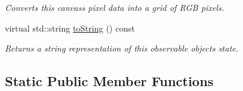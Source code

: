 \begin{DoxyCompactItemize}
\begin{DoxyCompactList}\small\item\em Converts this canvas\textquotesingle{}s pixel data into a grid of R\+GB pixels. \end{DoxyCompactList}\item 
virtual std\+::string \mbox{\hyperlink{classGObservable_a1fe5121d6528fdea3f243321b3fa3a49}{to\+String}} () const
\begin{DoxyCompactList}\small\item\em Returns a string representation of this observable object\textquotesingle{}s state. \end{DoxyCompactList}\end{DoxyCompactItemize}
\subsection*{Static Public Member Functions}
